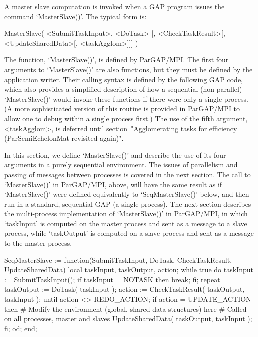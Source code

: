 
A master slave computation is invoked when a GAP program issues the
command `MasterSlave()'.  The typical form is:

\begintt
MasterSlave( <SubmitTaskInput>, <DoTask>
             [, <CheckTaskResult>[, <UpdateSharedData>[, <taskAgglom>]]] )
\endtt

The function, `MasterSlave()', is defined by ParGAP/MPI.  The first
four arguments to `MasterSlave()' are also functions, but they must be
defined by the application writer.  Their calling syntax is defined by
the following GAP code, which also provides a simplified description
of how a sequential (non-parallel) `MasterSlave()' would invoke these
functions if there were only a single process.  (A more sophisticated
version of this routine is provided in ParGAP/MPI to allow one to
debug within a single process first.)  The use of the fifth argument,
<taskAgglom>, is deferred until section~"Agglomerating tasks for
efficiency (ParSemiEchelonMat revisited again)".

In this section, we define `MasterSlave()' and describe the use of
its four arguments in a purely sequential environment.  The issues of
parallelism and passing of messages between processes is covered in
the next section.  The call to `MasterSlave()' in ParGAP/MPI, above,
will have the same result as if `MasterSlave()' were defined
equivalently to `SeqMasterSlave()' below, and then run in a
standard, sequential GAP (a single process).  The next section
describes the multi-process implementation of `MasterSlave()' in
ParGAP/MPI, in which `taskInput' is computed on the master process
and sent as a message to a slave process, while `taskOutput' is
computed on a slave process and sent as a message to the master
process.


\begintt
SeqMasterSlave :=
  function(SubmitTaskInput, DoTask, CheckTaskResult, UpdateSharedData)
  local taskInput, taskOutput, action;
  while true do
    taskInput := SubmitTaskInput();
    if taskInput = NOTASK then break; fi;
    repeat
      taskOutput := DoTask( taskInput );
      action := CheckTaskResult( taskOutput, taskInput );
    until action <> REDO_ACTION;
    if action = UPDATE_ACTION then
      # Modify the environment (global, shared data structures) here
      # Called on all processes, master and slaves
      UpdateSharedData( taskOutput, taskInput );
    fi;
  od;
end;
\endtt

